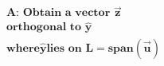 \documentclass[preview]{standalone}
\begin{document}
\begin{align*}
\textbf{A: Obtain a vector} \,\, \mathbf{\vec{z}} \\ \textbf{orthogonal to} \,\, \mathbf{\hat{y}} \\ \textbf{where} \mathbf{\hat{y}} \textbf{lies on} \,\, \mathbf{L} = \textbf{span}(\mathbf{\vec{u}})
\end{align*}
\end{document}
